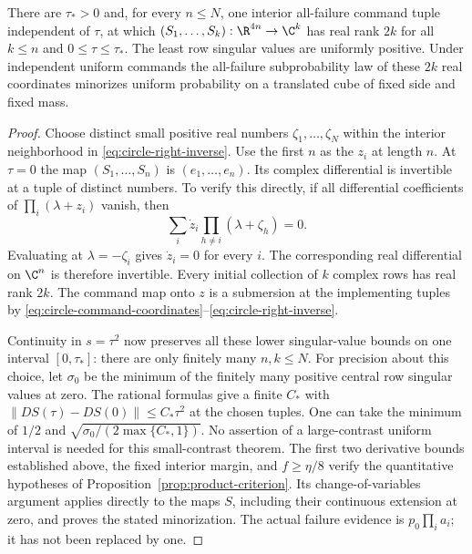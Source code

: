 \begin{lemma}
\label{lem:circle-attainment}
There are $\tau_*>0$ and, for every $n\le N$, one interior
all-failure command tuple independent of $\tau$, at which
$(S_1,\ldots,S_k):\R^{4n}\to\C^k$ has real rank $2k$ for all
$k\le n$ and $0\le\tau\le\tau_*$. The least row singular values
are uniformly positive. Under independent uniform commands the
all-failure subprobability law of these $2k$ real coordinates minorizes
uniform probability on a translated cube of fixed side and fixed mass.
\end{lemma}
\begin{proof}
Choose distinct small positive real numbers $\zeta_1,\ldots,\zeta_N$
within the interior neighborhood in \eqref{eq:circle-right-inverse}.
Use the first $n$ as the $z_i$ at length $n$. At $\tau=0$ the map
$(S_1,\ldots,S_n)$ is $(e_1,\ldots,e_n)$. Its complex differential
is invertible at a tuple of distinct numbers. To verify this directly,
if all differential coefficients of $\prod_i(\lambda+z_i)$ vanish,
then
\[
 \sum_i \dot z_i\prod_{h\ne i}(\lambda+\zeta_h)=0.
\]
Evaluating at $\lambda=-\zeta_i$ gives $\dot z_i=0$ for every $i$.
The corresponding real differential on $\C^n$ is therefore invertible.
Every initial collection of $k$ complex rows has real rank $2k$.
The command map onto $z$ is a submersion at the implementing tuples by
\eqref{eq:circle-command-coordinates}--\eqref{eq:circle-right-inverse}.

Continuity in $s=\tau^2$ now preserves all these lower singular-value
bounds on one interval $[0,\tau_*]$: there are only finitely many
$n,k\le N$. For precision about this choice, let $\sigma_0$ be the
minimum of the finitely many positive central row singular values at
zero. The rational formulas give a finite $C_*$ with
$\|D S(\tau)-D S(0)\|\le C_*\tau^2$ at the chosen tuples.
One can take the minimum of $1/2$ and
$\sqrt{\sigma_0/(2\max\{C_*,1\})}$. No assertion of a large-contrast
uniform interval is needed for this small-contrast theorem.
The first two derivative bounds established above, the fixed interior
margin, and $f\ge\eta/8$ verify the quantitative hypotheses of
Proposition~\ref{prop:product-criterion}. Its change-of-variables
argument applies directly to the maps $S$, including their continuous
extension at zero, and proves the stated minorization. The actual
failure evidence is $p_0\prod_i a_i$; it has not been replaced by one.
\end{proof}

